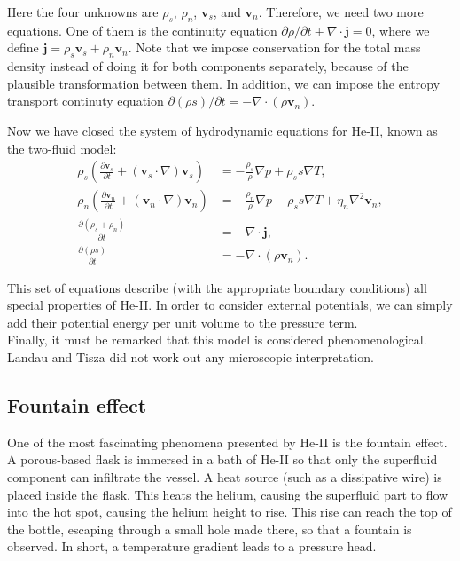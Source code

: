\documentclass{article}
\begin{document}
Here the four unknowns are $\rho_s$, $\rho_n$, $\mathbf{v}_s$, and $\mathbf{v}_n$. Therefore, we need two more equations. One of them is the continuity equation $\partial \rho / \partial t + \nabla \cdot \mathbf{j} = 0$, where we define $\mathbf{j} = \rho_s \mathbf{v}_s + \rho_n \mathbf{v}_n $. Note that we impose conservation for the total mass density instead of doing it for both components separately, because of the plausible transformation between them. In addition, we can impose the entropy transport continuty equation $\partial (\rho s) / \partial t = - \nabla \cdot (\rho \mathbf{v}_n)$.

Now we have closed the system of hydrodynamic equations for He-II, known as the two-fluid model:
\begin{align}
\rho_s \left( \frac{\partial \mathbf{v}_s}{\partial t} + (\mathbf{v}_s \cdot \nabla) \mathbf{v}_s \right) &= -\frac{\rho_s}{\rho} \nabla p + \rho_s s \nabla T,  \\
\rho_n \left( \frac{\partial \mathbf{v}_n}{\partial t} + (\mathbf{v}_n \cdot \nabla) \mathbf{v}_n \right) &= -\frac{\rho_n}{\rho} \nabla p - \rho_s s \nabla T + \eta_n \nabla^2 \mathbf{v}_n,  \\
\frac{\partial (\rho_s + \rho_n)}{\partial t} &= -\nabla \cdot \mathbf{j}, \\
\frac{\partial (\rho s)}{\partial t} &= -\nabla \cdot (\rho \mathbf{v}_n). 
\end{align}

This set of equations describe (with the appropriate boundary conditions) all special properties of He-II. In order to consider external potentials, we can simply add their potential energy per unit volume to the pressure term. 
\\

Finally, it must be remarked that this model is considered phenomenological. Landau and Tisza did not work out any microscopic interpretation. 

\subsection{Fountain effect}


One of the most fascinating phenomena presented by He-II is the fountain effect. A porous-based flask is immersed in a bath of He-II so that only the superfluid component can infiltrate the vessel. A heat source (such as a dissipative wire) is placed inside the flask. This heats the helium, causing the superfluid part to flow into the hot spot, causing the helium height to rise. This rise can reach the top of the bottle, escaping through a small hole made there, so that a fountain is observed. In short, a temperature gradient leads to a pressure head.
\\
\end{document}
